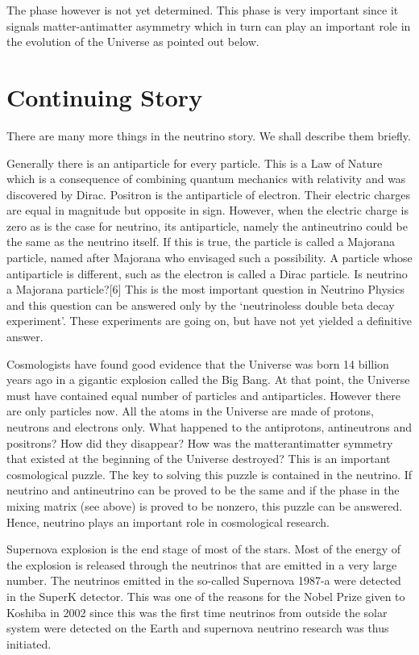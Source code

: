 The phase however is not yet determined. This phase is very important since it signals matter-antimatter asymmetry which in turn can play an
important role in the evolution of the Universe as pointed out below.

\section{Continuing Story}

There are many more things in the neutrino story. We shall describe
them briefly.

Generally there is an antiparticle for every particle. This is a Law of Nature which is a consequence of combining quantum mechanics with relativity
and was discovered by Dirac. Positron is the antiparticle of electron. Their electric charges are equal in magnitude but opposite in sign. However, when
the electric charge is zero as is the case for neutrino, its antiparticle, namely
the antineutrino could be the same as the neutrino itself. If this is true, the
particle is called a Majorana particle, named after Majorana who envisaged
such a possibility. A particle whose antiparticle is different, such as the electron is called a Dirac particle. Is neutrino a Majorana particle?[6] This is
the most important question in Neutrino Physics and this question can be
answered only by the ‘neutrinoless double beta decay experiment’. These
experiments are going on, but have not yet yielded a definitive answer.

Cosmologists have found good evidence that the Universe was born 14
billion years ago in a gigantic explosion called the Big Bang. At that point,
the Universe must have contained equal number of particles and antiparticles.
However there are only particles now. All the atoms in the Universe are made
of protons, neutrons and electrons only. What happened to the antiprotons,
antineutrons and positrons? How did they disappear? How was the matterantimatter symmetry that existed at the beginning of the Universe destroyed?
This is an important cosmological puzzle. The key to solving this puzzle is
contained in the neutrino. If neutrino and antineutrino can be proved to be
the same and if the phase in the mixing matrix (see above) is proved to be
nonzero, this puzzle can be answered. Hence, neutrino plays an important
role in cosmological research.

Supernova explosion is the end stage of most of the stars. Most of the
energy of the explosion is released through the neutrinos that are emitted in a
very large number. The neutrinos emitted in the so-called Supernova 1987-a
were detected in the SuperK detector. This was one of the reasons for the
Nobel Prize given to Koshiba in 2002 since this was the first time neutrinos
from outside the solar system were detected on the Earth and supernova
neutrino research was thus initiated.

